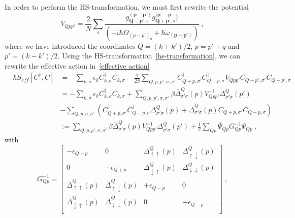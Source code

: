 \documentclass{article}
\begin{document}
In order to perform the HS-transformation, we must first rewrite the potential 
\begin{equation}
    V_{Qpp'} = \frac{2}{N} \sum_s \frac{g_{\textbf{Q} - \textbf{p'},s}^{(\textbf{p} - \textbf{p'})} g_{\textbf{Q} + \textbf{p'},s}^{(\textbf{p'} - \textbf{p}})}{\left(-i\hbar\Omega_{(p-p')_0} + \hbar \omega_{(\textbf{p} - \textbf{p'})}\right)}\;,
\end{equation}
where we have introduced the coordinates $Q = (k + k') / 2 $, $p = p' + q$ and $p' = (k - k')/2$. Using the HS-transformation~\cref{hs-transformation}, we can rewrite the effective action in~\cref{effective action}
\begin{align}
 - \hbar S_{eff}[C^{\dagger},C] &= -\sum_{k,\sigma} \epsilon_k C^{\dagger}_{k,\sigma} C_{k,\sigma} - \frac{1}{2\beta} \sum_{Q,p,p',\sigma,\sigma'} C^{\dagger}_{Q + p,\sigma'} C^{\dagger}_{Q - p,\sigma} V_{Q p p'}  C_{Q + p',\sigma'} C_{Q - p',\sigma}\label{effective action transformed}\\
                       &=  -\sum_{k,\sigma} \epsilon_k C^{\dagger}_{k,\sigma} C_{k,\sigma} +  \sum_{Q,p,p',\sigma,\sigma'} \beta \bar{\Delta}^{Q}_{\sigma' \sigma}(p) V^{-1}_{Q p p'} \Delta^{Q}_{\sigma' \sigma}(p')\nonumber\\
                       &- \sum_{Q,p,\sigma,\sigma'}\left( C^{\dagger}_{Q + p,\sigma'} C^{\dagger}_{Q - p,\sigma} \Delta^{Q}_{\sigma' \sigma}(p)+ \bar{\Delta}^{Q}_{\sigma' \sigma}(p)  C_{Q + p,\sigma'} C_{Q - p,\sigma}\right)\nonumber\\
                       &:= \sum_{Q,p,p',\sigma,\sigma'} \beta \bar{\Delta}^{Q}_{\sigma' \sigma}(p) V^{-1}_{Q p p'} \Delta^{Q}_{\sigma' \sigma}(p') + \frac{1}{2} \sum_{Q p} \bar{\Psi}_{Q p} G^{-1}_ {Q p} \Psi_{Q p}\;,
\end{align}
with 
\begin{equation}
     G_{Q p}^{-1} = 
\begin{bmatrix}
-\epsilon_{Q + p} & 0                & \Delta^{Q}_{\uparrow \uparrow}(p) & \Delta^{Q}_{\uparrow \downarrow}(p) \\
         0       & -\epsilon_{Q + p} & \Delta^{Q}_{\downarrow \uparrow}(p) & \Delta^{Q}_{\downarrow \downarrow}(p) \\
         \bar{\Delta}^{Q}_{\uparrow \uparrow}(p)       & \bar{\Delta}^{Q}_{\uparrow \downarrow}(p)                & +\epsilon_{Q-p} & 0 \\
         \bar{\Delta}^{Q}_{\downarrow \uparrow}(p)       & \bar{\Delta}^{Q}_{\downarrow \downarrow}(p)                & 0               & +\epsilon_{Q-p} \\
\end{bmatrix}\;,
\end{equation}
\end{document}
